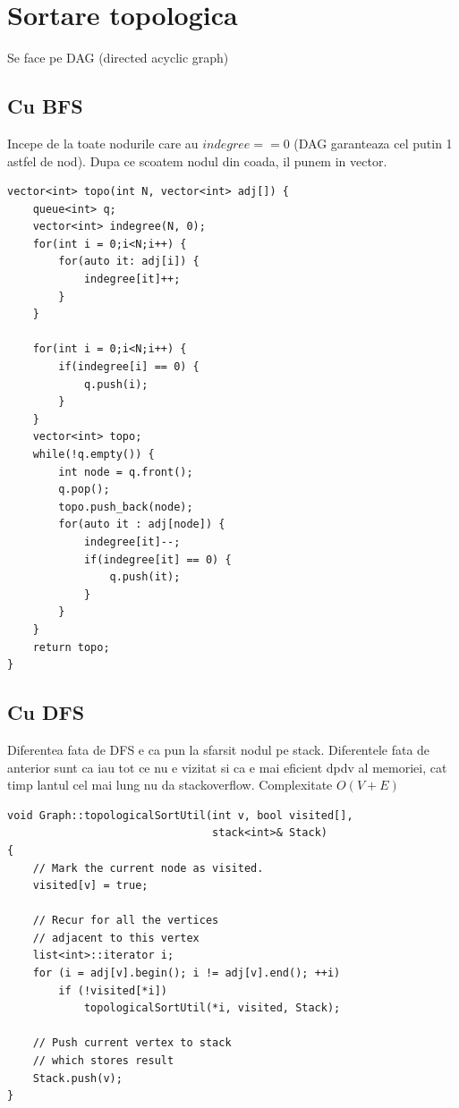 \documentclass{article}
\begin{document}
\section{Sortare topologica}
Se face pe DAG (directed acyclic graph)
\subsection*{Cu BFS} Incepe de la toate nodurile care au $indegree == 0$ (DAG garanteaza cel putin 1 astfel de nod). Dupa ce scoatem nodul din coada, il punem in vector.
\begin{lstlisting}
vector<int> topo(int N, vector<int> adj[]) {
    queue<int> q; 
    vector<int> indegree(N, 0); 
    for(int i = 0;i<N;i++) {
        for(auto it: adj[i]) {
            indegree[it]++; 
        }
    }
    
    for(int i = 0;i<N;i++) {
        if(indegree[i] == 0) {
            q.push(i); 
        }
    }
    vector<int> topo;
    while(!q.empty()) {
        int node = q.front(); 
        q.pop(); 
        topo.push_back(node);
        for(auto it : adj[node]) {
            indegree[it]--;
            if(indegree[it] == 0) {
                q.push(it); 
            }
        }
    }
    return topo;
}
    \end{lstlisting}
\subsection*{Cu DFS} Diferentea fata de DFS e ca pun la sfarsit nodul pe stack. Diferentele fata de anterior sunt ca iau tot ce nu e vizitat si ca e mai eficient dpdv al memoriei, cat timp lantul cel mai lung nu da stackoverflow. Complexitate $O(V+E)$

\begin{lstlisting}
void Graph::topologicalSortUtil(int v, bool visited[],
                                stack<int>& Stack)
{
    // Mark the current node as visited.
    visited[v] = true;
 
    // Recur for all the vertices
    // adjacent to this vertex
    list<int>::iterator i;
    for (i = adj[v].begin(); i != adj[v].end(); ++i)
        if (!visited[*i])
            topologicalSortUtil(*i, visited, Stack);
 
    // Push current vertex to stack
    // which stores result
    Stack.push(v);
}
    \end{lstlisting}
\end{document}
